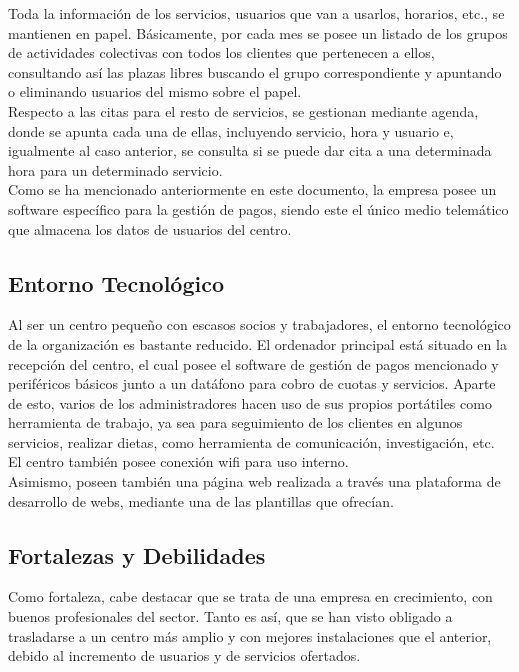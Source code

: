 Toda la información de los servicios, usuarios que van a usarlos, horarios, etc., se mantienen en papel. Básicamente, por cada mes se posee un listado de los grupos de actividades colectivas con todos los clientes que pertenecen a ellos, consultando así las plazas libres buscando el grupo correspondiente y apuntando o eliminando usuarios del mismo sobre el papel. \\
Respecto a las citas para el resto de servicios, se gestionan mediante agenda, donde se apunta cada una de ellas, incluyendo servicio, hora y usuario e, igualmente al caso anterior, se consulta si se puede dar cita a una determinada hora para un determinado servicio. 
\\

Como se ha mencionado anteriormente en este documento, la empresa posee un software específico para la gestión de pagos, siendo este el único medio telemático que almacena los datos de usuarios del centro.


\subsection{Entorno Tecnológico}

Al ser un centro pequeño con escasos socios y trabajadores, el entorno tecnológico de la organización es bastante reducido. El ordenador principal está situado en la recepción del centro, el cual posee el software de gestión de pagos mencionado y periféricos básicos junto a un datáfono para cobro de cuotas y servicios. Aparte de esto, varios de los administradores hacen uso de sus propios portátiles como herramienta de trabajo, ya sea para seguimiento de los clientes en algunos servicios, realizar dietas, como herramienta de comunicación, investigación, etc. 
\\

El centro también posee conexión wifi para uso interno.
\\

Asimismo, poseen también una página web realizada a través una plataforma de desarrollo de webs, mediante una de las plantillas que ofrecían.


\subsection{Fortalezas y Debilidades}

Como fortaleza, cabe destacar que se trata de una empresa en crecimiento, con buenos profesionales del sector. Tanto es así, que se han visto obligado a trasladarse a un centro más amplio y con mejores instalaciones que el anterior, debido al incremento de usuarios y de servicios ofertados.
\\

